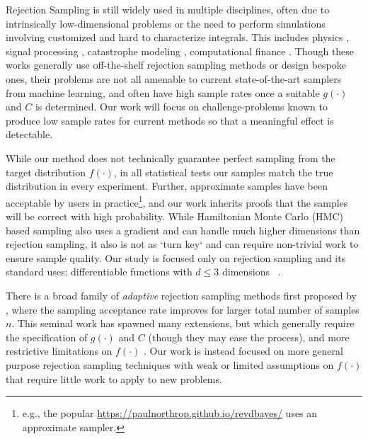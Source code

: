 \documentclass{ecai}  %
\begin{document}
Rejection Sampling is still widely used in multiple disciplines, often due to intrinsically low-dimensional problems or the need to perform simulations involving customized and hard to characterize integrals. This includes physics \cite{kermiche_total_2022,ozols_quantum_2012}, signal processing \cite{martino_generalized_2010}, catastrophe modeling \cite{jewson_adjusting_2020,mitchell-wallace_natural_2017}, computational finance \cite{nguyen_acceptance-rejection_2014,paskov_faster_1998}. Though these works generally use off-the-shelf rejection sampling methods or design bespoke ones, their problems are not all amenable to  current state-of-the-art samplers from machine learning, and often have high sample rates once a suitable $g(\cdot)$ and $C$ is determined. Our work will focus on challenge-problems known to produce low sample rates for current methods so that a meaningful effect is detectable. 

%
%

While our method does not technically guarantee perfect sampling from the target distribution $f(\cdot)$, in all statistical tests our samples match the true distribution in every experiment. Further, approximate samples have been acceptable by users in practice\footnote{e.g., the popular \url{https://paulnorthrop.github.io/revdbayes/} uses an approximate sampler.}, and our work inherits proofs that the samples will be correct with high probability. While Hamiltonian Monte Carlo (HMC) based sampling also uses a gradient and can handle much higher dimensions than rejection sampling, it also is not as `turn key` and can require non-trivial work to ensure sample quality. Our study is focused only on rejection sampling and its standard uses: differentiable functions with $d \leq 3$ dimensions ~\cite{kermiche_total_2022,ozols_quantum_2012,jewson_adjusting_2020,mitchell-wallace_natural_2017,nguyen_acceptance-rejection_2014,paskov_faster_1998,Jul2021}. 

There is a broad family of \textit{adaptive} rejection sampling methods first proposed by \cite{Genz1992}, where the sampling acceptance rate improves for larger total number of samples $n$. This seminal work has spawned many extensions, but which generally require the specification of $g(\cdot)$ and $C$ (though they may ease the process), and more restrictive limitations on $f(\cdot)$ \cite{Gorur2011,Casella2004,Evans1998,Hormann1995}. Our work is instead focused on more general purpose rejection sampling techniques with weak or limited assumptions on $f(\cdot)$ that require little work to apply to new problems. 
\end{document}
